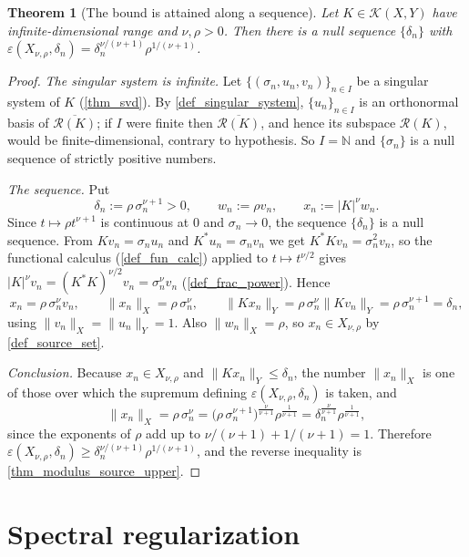 \documentclass[a4paper]{report}
\theoremstyle{plain}
\newtheorem{theorem}{Theorem}[chapter]
\theoremstyle{definition}
\theoremstyle{remark}
\newcommand{\Kk}{\mathcal{K}}
\newcommand{\Ran}{\mathcal{R}}
\begin{document}
\begin{theorem}[The bound is attained along a sequence]
  \label{thm_modulus_attained}
  Let $K \in \Kk(X,Y)$ have infinite-dimensional range and $\nu, \rho > 0$.  Then there is
  a null sequence $\{\delta_n\}$ with
  $\varepsilon(X_{\nu,\rho},\delta_n) = \delta_n^{\nu/(\nu+1)}\rho^{1/(\nu+1)}$.
\end{theorem}
\begin{proof}
  \emph{The singular system is infinite.}  Let $\{(\sigma_n,u_n,v_n)\}_{n \in I}$ be a
  singular system of $K$ (\cref{thm_svd}).  By \cref{def_singular_system}, $\{u_n\}_{n \in I}$
  is an orthonormal basis of $\overline{\Ran(K)}$; if $I$ were finite then
  $\overline{\Ran(K)}$, and hence its subspace $\Ran(K)$, would be finite-dimensional,
  contrary to hypothesis.  So $I = \mathbb{N}$ and $\{\sigma_n\}$ is a null sequence of
  strictly positive numbers.

  \emph{The sequence.}  Put
  \[
    \delta_n := \rho\,\sigma_n^{\nu+1} > 0, \qquad
    w_n := \rho v_n, \qquad x_n := |K|^{\nu}w_n .
  \]
  Since $t \mapsto \rho t^{\nu+1}$ is continuous at $0$ and $\sigma_n \to 0$, the sequence
  $\{\delta_n\}$ is a null sequence.  From $Kv_n = \sigma_nu_n$ and $K^{*}u_n =
  \sigma_nv_n$ we get $K^{*}Kv_n = \sigma_n^{2}v_n$, so the functional calculus
  (\cref{def_fun_calc}) applied to $t \mapsto t^{\nu/2}$ gives
  $|K|^{\nu}v_n = (K^{*}K)^{\nu/2}v_n = \sigma_n^{\nu}v_n$ (\cref{def_frac_power}).  Hence
  \[
    x_n = \rho\,\sigma_n^{\nu}v_n, \qquad
    \|x_n\|_X = \rho\,\sigma_n^{\nu}, \qquad
    \|Kx_n\|_Y = \rho\,\sigma_n^{\nu}\|Kv_n\|_Y = \rho\,\sigma_n^{\nu+1} = \delta_n ,
  \]
  using $\|v_n\|_X = \|u_n\|_Y = 1$.  Also $\|w_n\|_X = \rho$, so $x_n \in X_{\nu,\rho}$
  by \cref{def_source_set}.

  \emph{Conclusion.}  Because $x_n \in X_{\nu,\rho}$ and $\|Kx_n\|_Y \le \delta_n$, the
  number $\|x_n\|_X$ is one of those over which the supremum defining
  $\varepsilon(X_{\nu,\rho},\delta_n)$ is taken, and
  \[
    \|x_n\|_X = \rho\,\sigma_n^{\nu}
      = \bigl(\rho\,\sigma_n^{\nu+1}\bigr)^{\frac{\nu}{\nu+1}}\rho^{\frac{1}{\nu+1}}
      = \delta_n^{\frac{\nu}{\nu+1}}\rho^{\frac{1}{\nu+1}} ,
  \]
  since the exponents of $\rho$ add up to $\nu/(\nu+1) + 1/(\nu+1) = 1$.  Therefore
  $\varepsilon(X_{\nu,\rho},\delta_n) \ge \delta_n^{\nu/(\nu+1)}\rho^{1/(\nu+1)}$, and the
  reverse inequality is \cref{thm_modulus_source_upper}.
\end{proof}


\chapter{Spectral regularization}
\label{ch_15_spectral_regularization}
\end{document}
